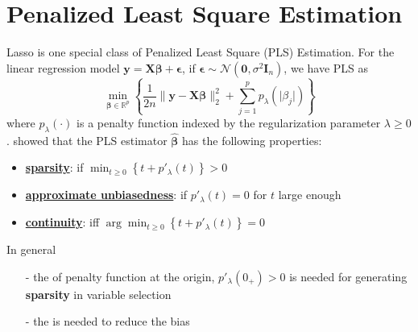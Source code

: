 \documentclass[twoside]{article}
\begin{document}
\section{Penalized Least Square Estimation}
Lasso is one special class of Penalized Least Square (PLS) Estimation. For the linear regression model $\mathbf{y}=\mathbf{X}\boldsymbol{\beta}+\boldsymbol{\epsilon}$, if $\boldsymbol{\epsilon} \sim \mathcal{N}(\mathbf{0},\sigma^2 \mathbf{I}_n)$, we have PLS as
$$
\min_{\boldsymbol{\beta}\in \mathbb{R}^p}\left\{ \frac{1}{2n} \lVert \mathbf{y}-\mathbf{X}\boldsymbol{\beta} \rVert^2_2 + \sum^p_{j=1}p_{\lambda}\left( \lvert \beta_j \rvert \right) \right\}
$$
where $p_{\lambda}(\cdot)$ is a penalty function indexed by the regularization parameter $\lambda \geq 0$. \citet{antoniadis2001regularization} showed that the PLS estimator $\hat{\boldsymbol{\beta}}$ has the following properties:
\begin{itemize}
    \item \textbf{\underline{sparsity}}: if $\min_{t\geq 0}\left\{ t+p'_{\lambda}(t) \right\}>0$
    \item \textbf{\underline{approximate unbiasedness}}: if $p'_{\lambda}(t)=0$ for $t$ large enough
    \item \textbf{\underline{continuity}}: iff $\arg \min_{t\geq 0}\left\{ t+p'_{\lambda}(t) \right\}=0$
\end{itemize}
In general
\begin{itemize}
    \item[-] the  of penalty function at the origin, $p'_{\lambda}(0_+)>0$ is needed for generating \textbf{sparsity} in variable selection
    \item[-] the  is needed to reduce the bias
\end{itemize}
\end{document}
